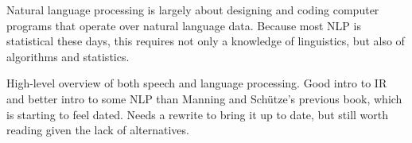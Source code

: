 \noindent
Natural language processing is largely about designing and coding computer
programs that operate over natural language data.  Because most NLP is
statistical these days, this requires not only a knowledge of linguistics,
but also of algorithms and statistics.

\begin{itemize}
{High-level overview of both speech and language
processing.}
%
{Good intro to IR and better intro to some NLP than
Manning and Sch\"utze's previous book, which is starting to feel
dated.}
%
{Needs a rewrite to bring it up to date, but still
worth reading given the lack of alternatives.}
\end{itemize}

